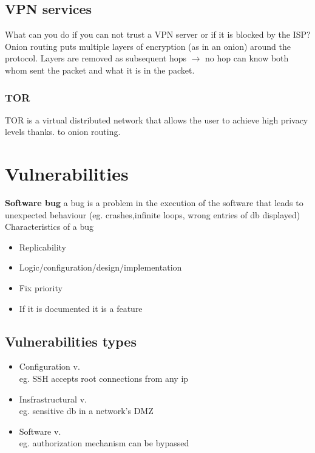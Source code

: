 \documentclass[10pt,a4paper]{book}
\begin{document}
\section{VPN services}
What can you do if you can not trust a VPN server or if it is blocked by the ISP?
Onion routing puts multiple layers of encryption (as in an  onion) around the protocol. Layers are removed as subsequent hops $\to$ no hop can know both whom sent the packet and what it is in the packet.
\subsection{TOR}
TOR is a virtual distributed network that allows the user to achieve high privacy levels thanks. to onion routing.

\chapter{Vulnerabilities}
\textbf{Software bug} a bug is a problem in the execution of the software that leads to unexpected behaviour (eg. crashes,infinite loops, wrong entries of db displayed)\\
Characteristics of a bug
\begin{itemize}
\item Replicability
\item Logic/configuration/design/implementation
\item Fix priority
\item If it is documented it is a feature
\end{itemize}
\section{Vulnerabilities types}
\begin{itemize}
\item Configuration v.\\
eg. SSH accepts root connections from any ip
\item Insfrastructural v.\\
eg. sensitive db in a network's DMZ
\item Software v.\\
eg. authorization mechanism can be bypassed
\end{itemize}
\end{document}

